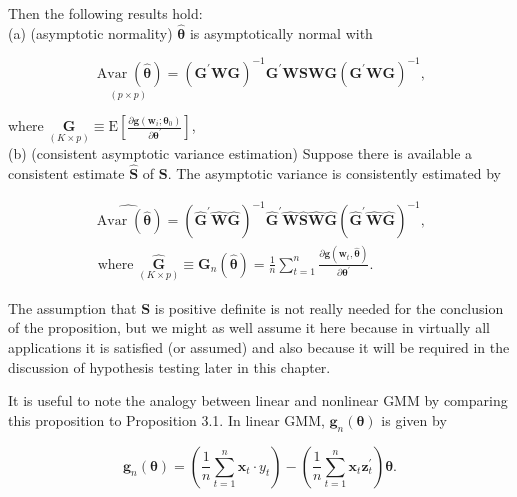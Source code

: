 \documentclass[10pt]{article}
\begin{document}
Then the following results hold:\\
(a) (asymptotic normality) $\hat{\boldsymbol{\theta}}$ is asymptotically normal with

$$
\underset{(p \times p)}{\operatorname{Avar}(\hat{\boldsymbol{\theta}})}=\left(\mathbf{G}^{\prime} \mathbf{W G}\right)^{-1} \mathbf{G}^{\prime} \mathbf{W S} \mathbf{W G}\left(\mathbf{G}^{\prime} \mathbf{W G}\right)^{-1},
$$

where $\underset{(K \times p)}{\mathbf{G}} \equiv \mathrm{E}\left[\frac{\partial \mathbf{g}\left(\mathbf{w}_{i} ; \boldsymbol{\theta}_{0}\right)}{\partial \boldsymbol{\theta}^{\prime}}\right]$,\\
(b) (consistent asymptotic variance estimation) Suppose there is available a consistent estimate $\widehat{\mathbf{S}}$ of $\mathbf{S}$. The asymptotic variance is consistently estimated by


\begin{gather*}
\widehat{\operatorname{Avar}(\hat{\boldsymbol{\theta}})}=\left(\widehat{\mathbf{G}}^{\prime} \widehat{\mathbf{W}} \widehat{\mathbf{G}}\right)^{-1} \widehat{\mathbf{G}}^{\prime} \widehat{\mathbf{W}} \widehat{\mathbf{S}} \widehat{\mathbf{W}} \widehat{\mathbf{G}}\left(\widehat{\mathbf{G}}^{\prime} \widehat{\mathbf{W}} \widehat{\mathbf{G}}\right)^{-1},  \tag{7.3.34}\\
\text { where } \underset{(K \times p)}{\widehat{\mathbf{G}}} \equiv \mathbf{G}_{n}(\hat{\boldsymbol{\theta}})=\frac{1}{n} \sum_{t=1}^{n} \frac{\partial \mathbf{g}\left(\mathbf{w}_{t}, \hat{\boldsymbol{\theta}}\right)}{\partial \boldsymbol{\theta}^{\prime}} .
\end{gather*}


The assumption that $\mathbf{S}$ is positive definite is not really needed for the conclusion of the proposition, but we might as well assume it here because in virtually all applications it is satisfied (or assumed) and also because it will be required in the discussion of hypothesis testing later in this chapter.

It is useful to note the analogy between linear and nonlinear GMM by comparing this proposition to Proposition 3.1. In linear GMM, $\mathbf{g}_{n}(\boldsymbol{\theta})$ is given by


\begin{equation*}
\mathbf{g}_{n}(\boldsymbol{\theta})=\left(\frac{1}{n} \sum_{t=1}^{n} \mathbf{x}_{t} \cdot y_{t}\right)-\left(\frac{1}{n} \sum_{t=1}^{n} \mathbf{x}_{t} \mathbf{z}_{t}^{\prime}\right) \boldsymbol{\theta} . \tag{7.3.35}
\end{equation*}
\end{document}

